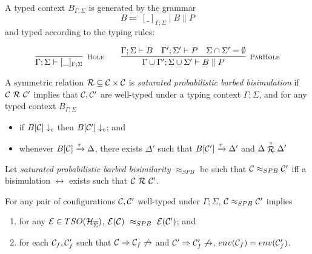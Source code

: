 A typed context $B_{\Gamma; \Sigma}$ is generated by the grammar
\[
B \Coloneqq \ [\_]_{\Gamma; \Sigma} \mid B \parallel P
\]
and typed according to the typing rules:

\[
 \infer[\mbox{\footnotesize\scshape Hole}]{\Gamma; \Sigma \vdash [\_]_{\Gamma; \Sigma}}{} 
 \qquad \infer[\mbox{\footnotesize\scshape ParHole}]{\Gamma \cup \Gamma'; \Sigma \cup \Sigma' \vdash B \parallel P}
{\Gamma; \Sigma \vdash B & \Gamma'; \Sigma' \vdash P & \Sigma \cap \Sigma' = \emptyset}
\]

\begin{definition}
	A symmetric relation $\mathcal{R} \subseteq \mathcal{C} \times \mathcal{C}$ is \emph{saturated probabilistic barbed bisimulation} if $\conf\ \rel\ \conf'$ implies that $\mathcal{C}, \mathcal{C}'$ are well-typed under a typing context $\Gamma; \Sigma$, and for any typed context $B_{\Gamma;\Sigma}$
	\begin{itemize}
		\item if $B[\mathcal{C}] \downarrow_{c}$ then $B[\mathcal{C}'] \downarrow_{c}$; and 
		\item whenever $B[\mathcal{C}] \xrightarrow{\tau} \Delta$, there exists $\Delta'$ such that $B[\mathcal{C}'] \xrightarrow{\tau} \Delta'$ and $\Delta \stackrel{\scriptscriptstyle \circ}{\mathcal{R}} \Delta'$
	\end{itemize}
	Let \emph{saturated probabilistic barbed bisimilarity} $\approx_{SPB}$ be such that $\mathcal{C} \approx_{SPB} \mathcal{C}'$ iff a bisimulation $\rel$ exists such that $\conf\ \rel\ \conf'$. 
\end{definition}

\begin{theorem}
	For any pair of configurations $\mathcal{C}, \mathcal{C}'$ well-typed under $\Gamma; \Sigma$, 
	$\mathcal{C} \approx_{SPB} \mathcal{C}'$ implies
	\begin{enumerate}
		\item for any $\mathcal{E} \in TSO(\mathcal{H}_{\overline{\Sigma}})$, $\mathcal{E} (\mathcal{C})\ \approx_{SPB}\ \mathcal{E} (\mathcal{C}')$; and
		\item for each $\mathcal{C}_f, \mathcal{C}_f'$ such that $\mathcal{C} \Rightarrow \mathcal{C}_f \not\rightarrow$ and $\mathcal{C}' \Rightarrow \mathcal{C}_f' \not\rightarrow$, $env(\mathcal{C}_f) = env(\mathcal{C}_f')$.
	\end{enumerate}
\end{theorem}




